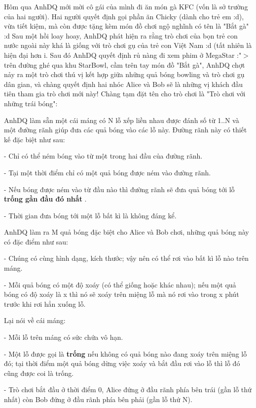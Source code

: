 Hôm qua AnhDQ mới mời cô gái của mình đi ăn món gà KFC (vốn là sở trường của hai người). Hai người quyết định gọi phần ăn Chicky (dành cho trẻ em :d), vừa tiết kiệm, mà còn được tặng kèm món đồ chơi ngộ nghĩnh có tên là "Bắt gà" :d Sau một hồi loay hoay, AnhDQ phát hiện ra rằng trò chơi của bọn trẻ con nước ngoài này khá là giống với trò chơi gụ của trẻ con Việt Nam :d (tất nhiên là hiện đại hơn ^^). Sau đó AnhDQ quyết định rủ nàng đi xem phim ở MegaStar :"$>$ trên đường ghé qua khu StarBowl, cầm trên tay món đồ "Bắt gà", AnhDQ chợt nảy ra một trò chơi thú vị kết hợp giữa những quả bóng bowling và trò chơi gụ dân gian, và chàng quyết định hai nhóc Alice và Bob sẽ là những vị khách đầu tiên tham gia trò chơi mới này! Chàng tạm đặt tên cho trò chơi là "Trò chơi với những trái bóng":  

   AnhDQ làm sẵn một cái máng có N lỗ xếp liền nhau được đánh số từ 1..N và một đường rãnh giúp đưa các quả bóng vào các lỗ này. Đường rãnh này có thiết kế đặc biệt như sau:   


   - Chỉ có thể ném bóng vào từ một trong hai đầu của đường rãnh.   


   - Tại một thời điểm chỉ có một quả bóng được ném vào đường rãnh.   


   - Nếu bóng được ném vào từ đầu nào thì đường rãnh sẽ đưa quả bóng tới lỗ   \textbf{    trống gần đầu đó nhất   }   .   


   - Thời gian đưa bóng tới một lỗ bất kì là không đáng kể.  

   AnhDQ làm ra M quả bóng đặc biệt cho Alice và Bob chơi, những quả bóng này có đặc điểm như sau:   


   - Chúng có cùng hình dạng, kích thước; vậy nên có thể rơi vào bất kì lỗ nào trên máng.   


   - Mỗi quả bóng có một độ xoáy (có thể giống hoặc khác nhau); nếu một quả bóng có độ xoáy là x thì nó sẽ xoáy trên miệng lỗ mà nó rơi vào trong x phút trước khi rơi hẳn xuống lỗ.  

   Lại nói về cái máng:   


   - Mỗi lỗ trên máng có sức chứa vô hạn.   


   - Một lỗ được gọi là   \textbf{    trống   }   nếu không có quả bóng nào đang xoáy trên miệng lỗ đó; tại thời điểm một quả bóng dừng việc xoáy và bắt đầu rơi vào lỗ thì lỗ đó cũng được coi là trống.  

   - Trò chơi bắt đầu ở thời điểm 0, Alice đứng ở đầu rãnh phía bên trái (gần lỗ thứ nhất) còn Bob đứng ở đầu rãnh phía bên phải (gần lỗ thứ N).   


